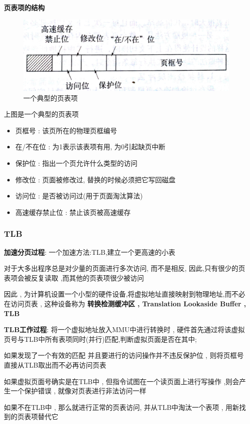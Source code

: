 \documentclass[UTF8,a4paper]{ctexart}
\begin{document}
\textbf{页表项的结构}
\begin{figure}[H]
	\centering
	\includegraphics[scale = 0.1]{assets/ModernOperatingSystems_c9507.png}
	\caption{一个典型的页表项}
\end{figure}
上图是一个典型的页表项
\begin{itemize}
	\item 页框号 : 该页所在的物理页框编号
	\item 在/不在位 : 为1表示该表项有用, 为0引起缺页中断
	\item 保护位 : 指出一个页允许什么类型的访问
	\item 修改位 : 页面被修改过, 替换的时候必须把它写回磁盘
	\item 访问位 : 是否被访问过(用于页面淘汰算法)
	\item 高速缓存禁止位 : 禁止该页被高速缓存
\end{itemize}

\subsubsection{TLB}

\textbf{加速分页过程}:
一个加速方法:TLB,建立一个更高速的小表

对于大多出程序总是对少量的页面进行多次访问, 而不是相反, 因此,只有很少的页表项会被反复读取 ,而其他的页表项很少被访问

因此 , 为计算机设置一个小型的硬件设备,将虚拟地址直接映射到物理地址,而不必在访问页表 , 这种设备称为 \textbf{转换检测缓冲区 , Translation Lookaside Buffer , TLB}

\textbf{TLB工作过程}:
将一个虚拟地址放入MMU中进行转换时 , 硬件首先通过将该虚拟页号与TLB中所有表项同时(并行)匹配,判断虚拟页面是否在其中;

如果发现了一个有效的匹配 并且要进行的访问操作并不违反保护位 , 则将页框号直接从TLB取出而不必再访问页表

如果虚拟页面号确实是在TLB中 , 但指令试图在一个读页面上进行写操作 ,则会产生一个保护错误 , 就像对页表进行非法访问一样

如果不在TLB中 , 那么就进行正常的页表访问, 并从TLB中淘汰一个表项 , 用新找到的页表项替代它
\end{document}
